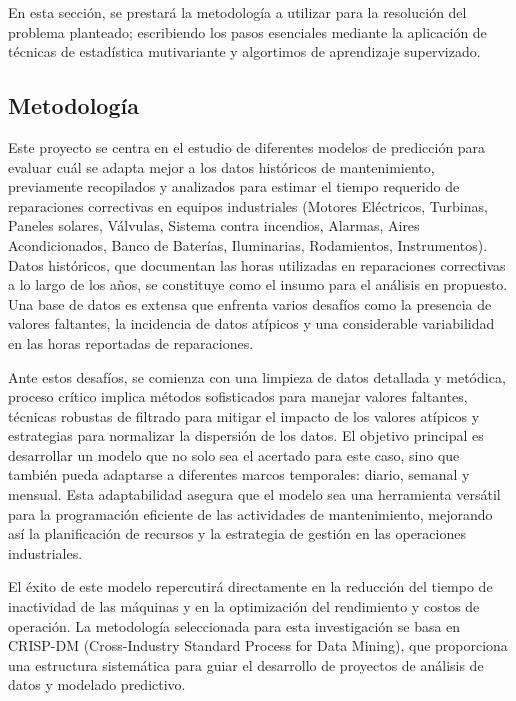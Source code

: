 \documentclass[
  11pt,
  bookmarksnumbered]{article}
\begin{document}
En esta sección, se prestará la metodología a utilizar para la resolución del problema planteado; escribiendo los pasos esenciales mediante la aplicación de técnicas de estadística mutivariante y algortimos de aprendizaje supervizado.

\hypertarget{metodologuxeda}{%
\subsection{Metodología}\label{metodologuxeda}}

Este proyecto se centra en el estudio de diferentes modelos de predicción para evaluar cuál se adapta mejor a los datos históricos de mantenimiento, previamente recopilados y analizados para estimar el tiempo requerido de reparaciones correctivas en equipos industriales (Motores Eléctricos, Turbinas, Paneles solares, Válvulas, Sistema contra incendios, Alarmas, Aires Acondicionados, Banco de Baterías, Iluminarias, Rodamientos, Instrumentos).
Datos históricos, que documentan las horas utilizadas en reparaciones correctivas a lo largo de los años, se constituye como el insumo para el análisis en propuesto.
Una base de datos es extensa que enfrenta varios desafíos como la presencia de valores faltantes, la incidencia de datos atípicos y una considerable variabilidad en las horas reportadas de reparaciones.

Ante estos desafíos, se comienza con una limpieza de datos detallada y metódica, proceso crítico implica métodos sofisticados para manejar valores faltantes, técnicas robustas de filtrado para mitigar el impacto de los valores atípicos y estrategias para normalizar la dispersión de los datos.
El objetivo principal es desarrollar un modelo que no solo sea el acertado para este caso, sino que también pueda adaptarse a diferentes marcos temporales: diario, semanal y mensual.
Esta adaptabilidad asegura que el modelo sea una herramienta versátil para la programación eficiente de las actividades de mantenimiento, mejorando así la planificación de recursos y la estrategia de gestión en las operaciones industriales.

El éxito de este modelo repercutirá directamente en la reducción del tiempo de inactividad de las máquinas y en la optimización del rendimiento y costos de operación.
La metodología seleccionada para esta investigación se basa en CRISP-DM (Cross-Industry Standard Process for Data Mining), que proporciona una estructura sistemática para guiar el desarrollo de proyectos de análisis de datos y modelado predictivo.
\end{document}
